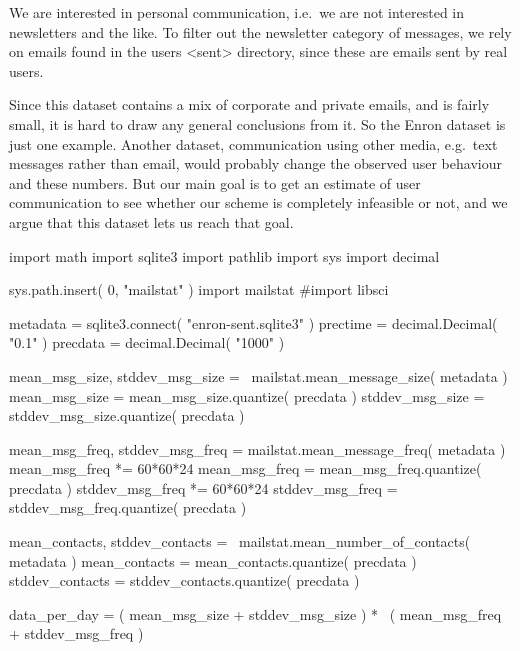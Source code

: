 We are interested in personal communication, i.e.~we are not interested in 
newsletters and the like.
To filter out the newsletter category of messages, we rely on emails found in 
the users <sent> directory, since these are emails sent by real users.


Since this dataset contains a mix of corporate and private emails, and is 
fairly small, it is hard to draw any general conclusions from it.
So the Enron dataset is just one example.
Another dataset, communication using other media, e.g.~text messages rather 
than email, would probably change the observed user behaviour and these 
numbers.
But our main goal is to get an estimate of user communication to see whether 
our scheme is completely infeasible or not, and we argue that this dataset lets 
us reach that goal.

\begin{pycode}[random]
import math
import sqlite3
import pathlib
import sys
import decimal

sys.path.insert( 0, "mailstat" )
import mailstat
#import libsci

metadata = sqlite3.connect( "enron-sent.sqlite3" )
prectime = decimal.Decimal( "0.1" )
precdata = decimal.Decimal( "1000" )

mean_msg_size, stddev_msg_size = \
  mailstat.mean_message_size( metadata )
mean_msg_size = mean_msg_size.quantize( precdata )
stddev_msg_size = stddev_msg_size.quantize( precdata )

mean_msg_freq, stddev_msg_freq = mailstat.mean_message_freq( metadata )
mean_msg_freq *= 60*60*24
mean_msg_freq = mean_msg_freq.quantize( precdata )
stddev_msg_freq *= 60*60*24
stddev_msg_freq = stddev_msg_freq.quantize( precdata )

mean_contacts, stddev_contacts = \
  mailstat.mean_number_of_contacts( metadata )
mean_contacts = mean_contacts.quantize( precdata )
stddev_contacts = stddev_contacts.quantize( precdata )

data_per_day = ( mean_msg_size + stddev_msg_size ) * \
  ( mean_msg_freq + stddev_msg_freq )
\end{pycode}

